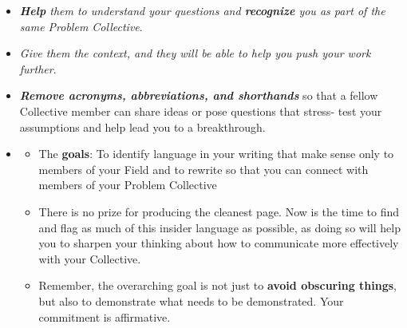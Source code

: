\documentclass[11pt]{article}
\begin{document}
\begin{itemize}
\item \emph{\textbf{Help} them to understand your questions and \textbf{recognize} you as part of the same Problem Collective}. 

\item \emph{Give them the context, and they will be able to help you push your work further}. 

\item \emph{\textbf{Remove acronyms, abbreviations, and shorthands}} so that a fellow Collective member can share ideas or pose questions that stress- test your assumptions and help lead you to a breakthrough.

\item \begin{exercise}
\begin{itemize}
\item The \textbf{goals}: To identify language in your writing that make sense only to members of your Field and to rewrite so that you can connect with members of your Problem Collective

\item There is no prize for producing the cleanest page. Now is the time to find and flag as much of this insider language as possible, as doing so will help you to sharpen your thinking about how to communicate more effectively with your Collective.

\item Remember, the overarching goal is not just to \textbf{avoid obscuring things}, but also to demonstrate what needs to be demonstrated. Your commitment is affirmative.
\end{itemize}
\end{exercise}
\end{itemize}
\end{document}
